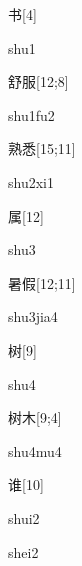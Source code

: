 \begin{verbete}[shu1]{书}[4]
\begin{pronuncia}{shu1}
\end{pronuncia}
\end{verbete}

\begin{verbete}[shu1fu2]{舒服}[12;8]
\begin{pronuncia}{shu1fu2}
\end{pronuncia}
\end{verbete}

\begin{verbete}[shu2xi1]{熟悉}[15;11]
\begin{pronuncia}{shu2xi1}
\end{pronuncia}
\end{verbete}

\begin{verbete}[shu3]{属}[12]
\begin{pronuncia}{shu3}
\end{pronuncia}
\end{verbete}

\begin{verbete}{暑假}[12;11]
\begin{pronuncia}{shu3jia4}
\end{pronuncia}
\end{verbete}

\begin{verbete}[shu4]{树}[9]
\begin{pronuncia}{shu4}
\end{pronuncia}
\end{verbete}

\begin{verbete}[shu4mu4]{树木}[9;4]
\begin{pronuncia}{shu4mu4}
\end{pronuncia}
\end{verbete}

\begin{verbete}[shui2]{谁}[10]
\begin{pronuncia}{shui2}
\end{pronuncia}
\begin{pronuncia}{shei2}
\end{pronuncia}
\end{verbete}

